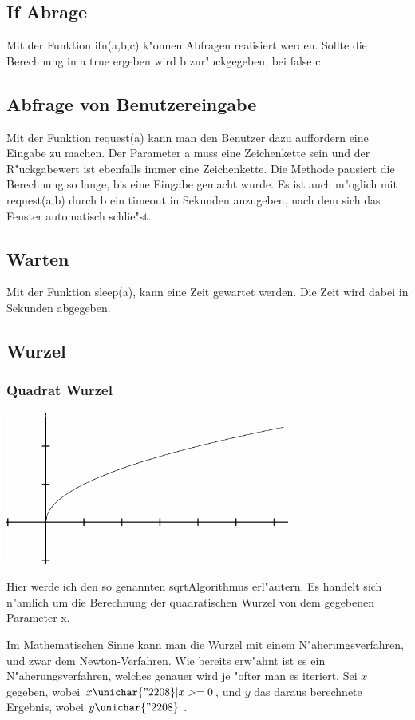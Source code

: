 \documentclass{scrartcl}
\begin{document}
\subsection{If Abrage}
Mit der Funktion ifn(a,b,c) k"onnen Abfragen realisiert werden. Sollte die Berechnung in a true ergeben wird b zur"uckgegeben, bei false c.
\subsection{Abfrage von Benutzereingabe}
Mit der Funktion request(a) kann man den Benutzer dazu auffordern eine Eingabe zu machen. Der Parameter a muss eine Zeichenkette sein und der R"uckgabewert ist ebenfalls immer eine Zeichenkette. Die Methode pausiert die Berechnung so lange, bis eine Eingabe gemacht wurde. Es ist auch m"oglich mit request(a,b) durch b ein timeout in Sekunden anzugeben, nach dem sich das Fenster automatisch schlie"st.
\subsection{Warten}
Mit der Funktion sleep(a), kann eine Zeit gewartet werden. Die Zeit wird dabei in Sekunden abgegeben.
\subsection{Wurzel}
\subsubsection{Quadrat Wurzel}
\includegraphics[width=0.7\textwidth]{images/functions/wurzel.png}\newline

Hier werde ich den so genannten \glqq sqrt\grqq Algorithmus erl"autern. Es handelt sich n"amlich um die Berechnung der quadratischen Wurzel von dem gegebenen Parameter x.\newline

Im Mathematischen Sinne kann man die Wurzel mit einem N"aherungsverfahren, und zwar dem Newton-Verfahren.\newline
Wie bereits erw"ahnt ist es ein N"aherungsverfahren, welches genauer wird je "ofter man es iteriert.\newline
Sei \(x\) gegeben, wobei \(x\unichar{"2208} | x > = 0\), und \(y\) das daraus berechnete Ergebnis, wobei \(y \unichar{"2208}\) .\newline
\end{document}
